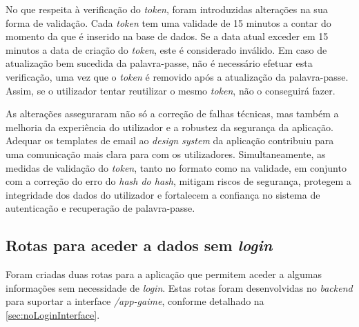 No que respeita à verificação do \textit{token}, foram introduzidas alterações na sua forma de validação. Cada \textit{token} tem uma validade de 15 minutos a contar do momento da que é inserido na base de dados. Se a data atual exceder em 15 minutos a data de criação do \textit{token}, este é considerado inválido. Em caso de atualização bem sucedida da palavra-passe, não é necessário efetuar esta verificação, uma vez que o \textit{token} é removido após a atualização da palavra-passe. Assim, se o utilizador tentar reutilizar o mesmo \textit{token}, não o conseguirá fazer.

As alterações asseguraram não só a correção de falhas técnicas, mas também a melhoria da experiência do utilizador e a robustez da segurança da aplicação. Adequar os templates de email ao \textit{design system} da aplicação contribuiu para uma comunicação mais clara para com os utilizadores. Simultaneamente, as medidas de validação do \textit{token}, tanto no formato como na validade, em conjunto com a correção do erro do \textit{hash do hash},
mitigam riscos de segurança, protegem a integridade dos dados do utilizador e fortalecem a confiança no sistema de autenticação e recuperação de palavra-passe.

\subsection{Rotas para aceder a dados sem \textit{login}}\label{sec:noLoginAppGaime} %




Foram criadas duas rotas para a aplicação que permitem aceder a algumas informações sem necessidade de \textit{login}. Estas rotas foram desenvolvidas no \textit{backend} para suportar a interface \textit{/app-gaime}, conforme detalhado na \autoref{sec:noLoginInterface}.

